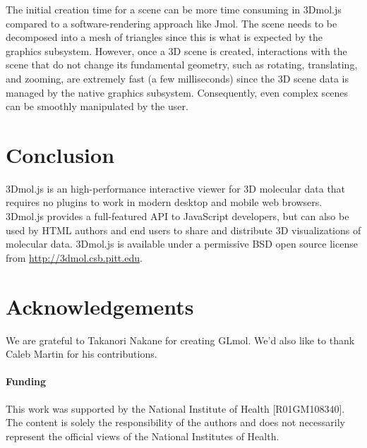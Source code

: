 \documentclass[]{bioinfo}
\begin{document}
The initial creation time for a scene can be more time consuming in 3Dmol.js compared to a software-rendering approach like Jmol.
 The scene needs to be decomposed into a mesh of triangles since this is what is expected
by the graphics subsystem. However, once a 3D scene is created, interactions with the scene that do not change its fundamental geometry,
such as rotating, translating, and zooming, are extremely fast (a few milliseconds) since the 3D scene data is managed by the native graphics subsystem.
Consequently, even complex scenes can be smoothly manipulated by the user.

\vspace{-10pt}
\section{Conclusion}
3Dmol.js is an high-performance interactive viewer for 3D molecular data that requires no plugins to work in modern desktop and mobile web browsers.
3Dmol.js provides a full-featured API to JavaScript developers, but can also be used by HTML authors and end users to share and distribute
3D visualizations of molecular data. 3Dmol.js is available under a permissive BSD open source license from \url{http://3dmol.csb.pitt.edu}.
 
 \vspace{-10pt}
\section*{Acknowledgements}
 We are grateful to Takanori Nakane for creating GLmol. 
We'd also like to thank Caleb Martin for his contributions.

\paragraph{Funding\textcolon} 
This work was supported by the National Institute of Health [R01GM108340].
The content is solely the responsibility of the authors and does not necessarily represent the official views of the National Institutes of Health.
\vspace{-10pt}


\end{document}

